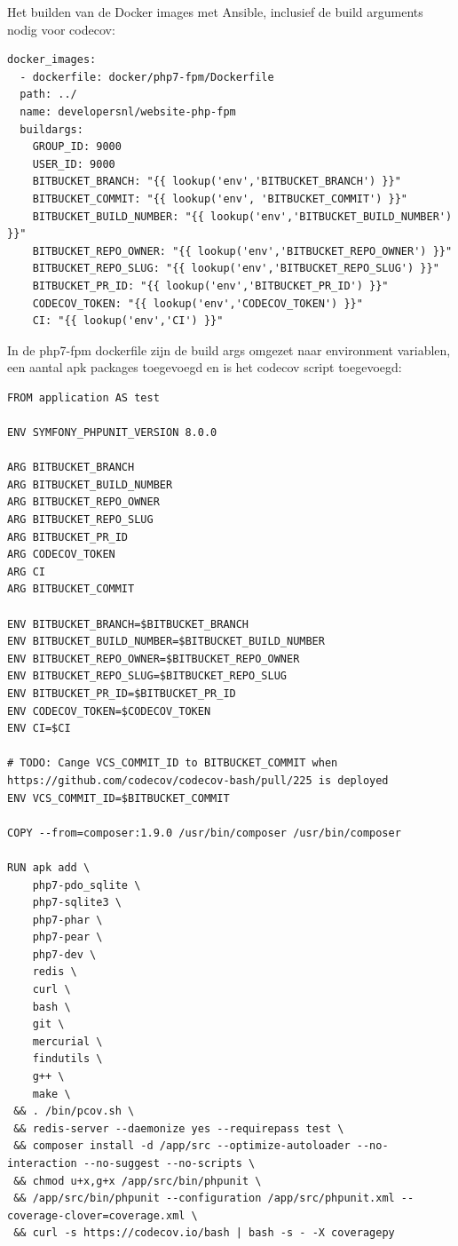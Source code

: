 Het builden van de Docker images met Ansible, inclusief de build arguments nodig voor codecov:
\begin{verbatim}
docker_images:
  - dockerfile: docker/php7-fpm/Dockerfile
  path: ../
  name: developersnl/website-php-fpm
  buildargs:
    GROUP_ID: 9000
    USER_ID: 9000
    BITBUCKET_BRANCH: "{{ lookup('env','BITBUCKET_BRANCH') }}"
    BITBUCKET_COMMIT: "{{ lookup('env', 'BITBUCKET_COMMIT') }}"
    BITBUCKET_BUILD_NUMBER: "{{ lookup('env','BITBUCKET_BUILD_NUMBER') }}"
    BITBUCKET_REPO_OWNER: "{{ lookup('env','BITBUCKET_REPO_OWNER') }}"
    BITBUCKET_REPO_SLUG: "{{ lookup('env','BITBUCKET_REPO_SLUG') }}"
    BITBUCKET_PR_ID: "{{ lookup('env','BITBUCKET_PR_ID') }}"
    CODECOV_TOKEN: "{{ lookup('env','CODECOV_TOKEN') }}"
    CI: "{{ lookup('env','CI') }}"
\end{verbatim}

In de php7-fpm dockerfile zijn de build args omgezet naar environment variablen, een aantal apk packages toegevoegd en is het codecov script toegevoegd:
\begin{verbatim}
FROM application AS test

ENV SYMFONY_PHPUNIT_VERSION 8.0.0

ARG BITBUCKET_BRANCH
ARG BITBUCKET_BUILD_NUMBER
ARG BITBUCKET_REPO_OWNER
ARG BITBUCKET_REPO_SLUG
ARG BITBUCKET_PR_ID
ARG CODECOV_TOKEN
ARG CI
ARG BITBUCKET_COMMIT

ENV BITBUCKET_BRANCH=$BITBUCKET_BRANCH
ENV BITBUCKET_BUILD_NUMBER=$BITBUCKET_BUILD_NUMBER
ENV BITBUCKET_REPO_OWNER=$BITBUCKET_REPO_OWNER
ENV BITBUCKET_REPO_SLUG=$BITBUCKET_REPO_SLUG
ENV BITBUCKET_PR_ID=$BITBUCKET_PR_ID
ENV CODECOV_TOKEN=$CODECOV_TOKEN
ENV CI=$CI

# TODO: Cange VCS_COMMIT_ID to BITBUCKET_COMMIT when https://github.com/codecov/codecov-bash/pull/225 is deployed
ENV VCS_COMMIT_ID=$BITBUCKET_COMMIT

COPY --from=composer:1.9.0 /usr/bin/composer /usr/bin/composer

RUN apk add \
    php7-pdo_sqlite \
    php7-sqlite3 \
    php7-phar \
    php7-pear \
    php7-dev \
    redis \
    curl \
    bash \
    git \
    mercurial \
    findutils \
    g++ \
    make \
 && . /bin/pcov.sh \
 && redis-server --daemonize yes --requirepass test \
 && composer install -d /app/src --optimize-autoloader --no-interaction --no-suggest --no-scripts \
 && chmod u+x,g+x /app/src/bin/phpunit \
 && /app/src/bin/phpunit --configuration /app/src/phpunit.xml --coverage-clover=coverage.xml \
 && curl -s https://codecov.io/bash | bash -s - -X coveragepy
\end{verbatim}

